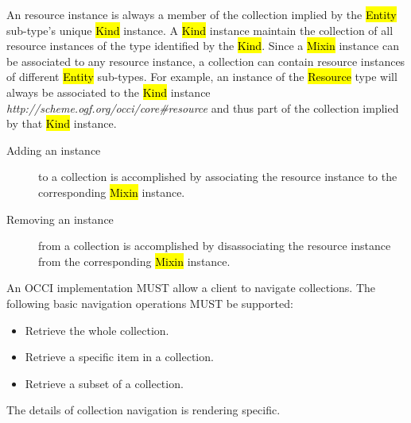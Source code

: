 \documentclass[10pt,a4paper,british]{article}
\begin{document}
An resource instance is always a member of the collection implied by the
\hl{Entity} sub-type's unique \hl{Kind} instance. A \hl{Kind} instance maintain
the collection of all resource instances of the type identified by the
\hl{Kind}.
%
Since a \hl{Mixin} instance can be associated to any resource instance, a
collection can contain resource instances of different \hl{Entity} sub-types.
%
For example, an instance of the \hl{Resource} type will always be associated
to the \hl{Kind} instance
\textit{http://scheme.ogf.org/occi/core\#resource} and thus part of the
collection implied by that \hl{Kind} instance.
\begin{description}
\item[Adding an instance] to a collection is accomplished by associating the
 resource instance to the corresponding \hl{Mixin} instance.
\item[Removing an instance] from a collection is accomplished by disassociating
 the resource instance from the corresponding \hl{Mixin} instance.
\end{description}
%
An OCCI implementation MUST allow a client to navigate collections. The
following basic navigation operations MUST be supported:
\begin{itemize}
\item Retrieve the whole collection.
\item Retrieve a specific item in a collection.
\item Retrieve a subset of a collection.
\end{itemize}
The details of collection navigation is rendering specific.
\end{document}
